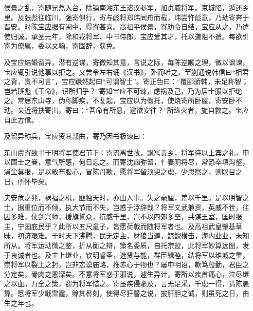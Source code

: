 \documentclass[]{article}
\begin{document}
侯景之乱，寄随兄荔入台，除镇南湘东王谘议参军，加贞威将军。京城陷，遁还乡里。及张彪往临川，强寄俱行，寄与彪将郑玮同舟而载，玮尝忤彪意，乃劫寄奔于晋安。时陈宝应据有闽中，得寄甚喜。高祖平侯景，寄劝令自结，宝应从之，乃遣使归诚。承圣元年，除和戎将军、中书侍郎，宝应爱其才，托以道阻不遣。每欲引寄为僚属，委以文翰，寄固辞，获免。

及宝应结婚留异，潜有逆谋，寄微知其意，言说之际，每陈逆顺之理，微以讽谏，宝应辄引说他事以拒之。又尝令左右诵《汉书》，卧而听之，至蒯通说韩信曰``相君之背，贵不可言''，宝应蹶然起曰``可谓智士''。寄正色曰：``覆郦骄韩，未足称智；岂若班彪《王命》，识所归乎？''寄知宝应不可谏，虑祸及己，乃为居士服以拒绝之。常居东山寺，伪称脚疾，不复起，宝应以为假托，使烧寄所卧屋，寄安卧不动。亲近将扶寄出，寄曰：``吾命有所悬，避欲安往？''所纵火者，旋自救之。宝应自此方信。

及留异称兵，宝应资其部曲，寄乃因书极谏曰：

东山虞寄致书于明将军使君节下：寄流离世故，飘寓贵乡，将军待以上宾之礼，申以国士之眷，意气所感，何日忘之。而寄沈痼弥留，忄妻阴将尽，常恐卒填沟壑，涓尘莫报，是以敢布腹心，冒陈丹款，愿将军留须臾之虑，少思察之，则瞑目之日，所怀毕矣。

夫安危之兆，祸福之机，匪独天时，亦由人事。失之毫厘，差以千里。是以明智之士，据重位而不倾，执大节而不失，岂惑于浮辞哉？将军文武兼资，英威不世，往因多难，仗剑兴师，援旗誓众，抗威千里，岂不以四郊多垒，共谋王室，匡时报主，宁国庇民乎？此所以五尺童子，皆愿荷戟而随将军者也。及高祖武皇肇基草昧，初济艰难。于时天下沸腾，民无定主，豺狼当道，鲸鲵横击，海内业业，未知所从。将军运动微之鉴，折从衡之辩，策名委质，自托宗盟，此将军妙算远图，发于衷诚者也。及主上继业，钦明睿圣，选贤与能，群臣辑睦，结将军以维城之重，崇将军以裂土之封。岂非宏谟庙略，推赤心于物也？屡申明诏，款笃殷勤，君臣之分定矣，骨肉之恩深矣。不意将军惑于邪说，遽生异计，寄所以疾首痛心，泣尽继之以血。万全之策，窃为将军惜之。寄虽疾侵耄及，言无足采，千虑一得，请陈愚算。愿将军少戢雷霆，赊其晷刻，使得尽狂瞽之说，披肝胆之诚，则虽死之日，由生之年也。
\end{document}
